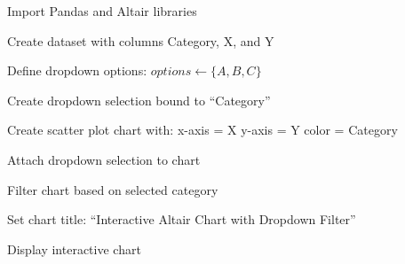 \begin{algorithm}
\caption{Interactive Altair Chart with Dropdown Filter}
\begin{algorithmic}[1]

\STATE Import Pandas and Altair libraries

\STATE Create dataset with columns Category, X, and Y

\STATE Define dropdown options:
\STATE $options \gets \{A, B, C\}$

\STATE Create dropdown selection bound to ``Category''

\STATE Create scatter plot chart with:
\STATE x-axis = X
\STATE y-axis = Y
\STATE color = Category

\STATE Attach dropdown selection to chart

\STATE Filter chart based on selected category

\STATE Set chart title: ``Interactive Altair Chart with Dropdown Filter''

\STATE Display interactive chart

\end{algorithmic}
\end{algorithm}